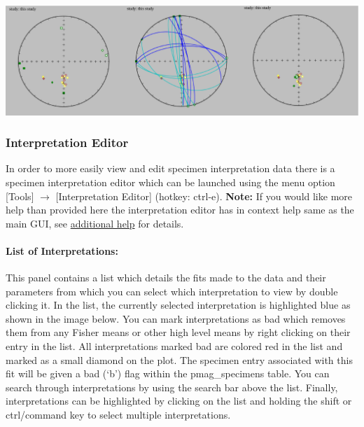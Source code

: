 \documentclass[11pt]{book}
\begin{document}
{\includegraphics[width=30 cm]{EPSFiles/demag_gui_HLMTypes.eps}

\subsubsection{Interpretation Editor}\label{interpretation-editor} %

In order to more easily view and edit specimen interpretation data there is a specimen interpretation editor which can be launched using the menu option [Tools] $\rightarrow$ [Interpretation Editor] (hotkey: ctrl-e). \textbf{Note:} If you would like more help than provided here the interpretation editor has in context help same as the main GUI, see \hyperref[add-help]{additional help} for details.
\paragraph{List of Interpretations:}\label{IE-list} This panel contains a list which details the fits made to the data and their parameters from which you can select which interpretation to view by double clicking it. In the list, the currently selected interpretation is highlighted blue as shown in the image below. You can mark interpretations as bad which removes them from any Fisher means or other high level means by right clicking on their entry in the list. All interpretations marked bad are colored red in the list and marked as a small diamond on the plot. The specimen entry associated with this fit will be given a bad (`b') flag within the pmag\_specimens table. You can search through interpretations by using the search bar above the list. Finally, interpretations can be highlighted by clicking on the list and holding the shift or ctrl/command key to select multiple interpretations.
}
\end{document}
